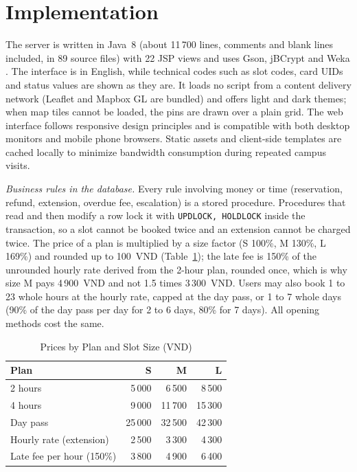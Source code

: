 \section{Implementation}
The server is written in Java~8 (about 11\,700 lines, comments and blank lines included, in 89 source files) with
22 JSP views and uses Gson, jBCrypt \cite{provos1999bcrypt} and Weka \cite{hall2009weka}. The interface is in English,
while technical codes such as slot codes, card UIDs and status values are shown as they are. It loads no script from a
content delivery network (Leaflet and Mapbox GL are bundled) and offers light and dark themes; when map tiles cannot be
loaded, the pins are drawn over a plain grid. The web interface follows responsive design principles and is compatible with
both desktop monitors and mobile phone browsers. Static assets and client-side templates are cached locally to minimize
bandwidth consumption during repeated campus visits.

\textit{Business rules in the database.} Every rule involving money or time (reservation, refund, extension,
overdue fee, escalation) is a stored procedure. Procedures that read and then modify a row lock it with
\texttt{UPDLOCK, HOLDLOCK} inside the transaction, so a slot cannot be booked twice and an extension cannot be charged
twice. The price of a plan is multiplied by a size factor (S 100\%, M 130\%, L 169\%) and rounded up to 100~VND
(Table~\ref{tab:price}); the late fee is 150\% of the unrounded hourly rate derived from the 2-hour plan, rounded once,
which is why size M pays 4\,900~VND and not 1.5 times 3\,300~VND. Users may also book 1 to 23 whole hours at the hourly
rate, capped at the day pass, or 1 to 7 whole days (90\% of the day pass per day for 2 to 6 days, 80\% for 7 days).
All opening methods cost the same.

\begin{table}[!htbp]
\renewcommand{\arraystretch}{1.1}
\centering
\small
\caption{Prices by Plan and Slot Size (VND)}
\label{tab:price}
\begin{tabular}{l r r r}
\hline
Plan & S & M & L \\
\hline
2 hours & 5\,000 & 6\,500 & 8\,500 \\
4 hours & 9\,000 & 11\,700 & 15\,300 \\
Day pass & 25\,000 & 32\,500 & 42\,300 \\
Hourly rate (extension) & 2\,500 & 3\,300 & 4\,300 \\
Late fee per hour (150\%) & 3\,800 & 4\,900 & 6\,400 \\
\hline
\end{tabular}
\end{table}

